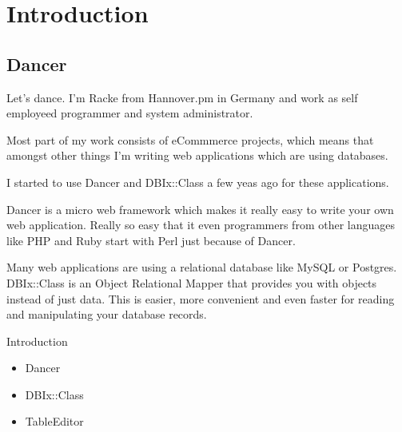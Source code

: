 
\section{Introduction}


\subsection{Dancer}

Let's dance. I'm Racke from Hannover.pm in Germany and work
as self employeed programmer and system administrator.

Most part of my work consists of eCommmerce projects, which
means that amongst other things I'm writing web applications which are using
databases.

I started to use Dancer and DBIx::Class a few yeas ago for these applications.

Dancer is a micro web framework which makes it really easy
to write your own web application. Really so easy that it even
programmers from other languages like PHP and Ruby start with Perl
just because of Dancer.

Many web applications are using a relational database like MySQL
or Postgres. DBIx::Class is an Object Relational Mapper that provides
you with objects instead of just data. This is easier, more convenient 
and even faster for reading and manipulating your database records.

\begin{frame}{Introduction}
\begin{itemize}
\item Dancer
\item DBIx::Class
\item TableEditor
\end{itemize}
\end{frame}

